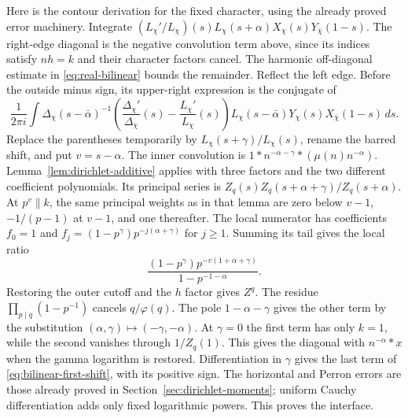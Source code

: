 Here is the contour derivation for the fixed character, using the
already proved error machinery. Integrate
$(L_\chi'/L_\chi)(s)L_\chi(s+\alpha)X_\chi(s)Y_{\bar\chi}(1-s)$.
The right-edge diagonal is the negative convolution term above, since
its indices satisfy $nh=k$ and their character factors cancel.
The harmonic off-diagonal estimate in \eqref{eq:real-bilinear} bounds
the remainder. Reflect the left edge. Before the outside minus sign,
its upper-right expression is the conjugate of
\[
 \frac1{2\pi i}\int
 \Delta_\chi(s-\bar\alpha)^{-1}
 \left(\frac{\Delta_\chi'}{\Delta_\chi}(s)
                         -\frac{L_\chi'}{L_\chi}(s)\right)
 L_\chi(s-\bar\alpha)Y_\chi(s)X_{\bar\chi}(1-s)\,ds.
\]
Replace the parentheses temporarily by $L_\chi(s+\gamma)/L_\chi(s)$,
rename the barred shift, and put $v=s-\alpha$. The inner convolution
is $1*n^{-\alpha-\gamma}*(\mu(n)n^{-\alpha})$.
Lemma~\ref{lem:dirichlet-additive} applies with three factors and the
two different coefficient polynomials. Its principal series is
$Z_q(s)Z_q(s+\alpha+\gamma)/Z_q(s+\alpha)$.
At $p^v\parallel k$, the same principal weights as in that lemma are
zero below $v-1$, $-1/(p-1)$ at $v-1$, and one thereafter.
The local numerator has coefficients $f_0=1$ and
$f_j=(1-p^\gamma)p^{-j(\alpha+\gamma)}$ for $j\ge1$.
Summing its tail gives the local ratio
\[
 \frac{(1-p^\gamma)p^{-v(1+\alpha+\gamma)}}{1-p^{-1-\alpha}}.
\]
Restoring the outer cutoff and the $h$ factor gives $Z^q$.
The residue $\prod_{p\mid q}(1-p^{-1})$ cancels $q/\varphi(q)$.
The pole $1-\alpha-\gamma$ gives the other term by the substitution
$(\alpha,\gamma)\mapsto(-\gamma,-\alpha)$.
At $\gamma=0$ the first term has only $k=1$, while the second
vanishes through $1/Z_q(1)$. This gives the diagonal with
$n^{-\alpha}*x$ when the gamma logarithm is restored.
Differentiation in $\gamma$ gives the last term of
\eqref{eq:bilinear-first-shift}, with its positive sign.
The horizontal and Perron errors are those already proved in
Section~\ref{sec:dirichlet-moments}; uniform Cauchy differentiation
adds only fixed logarithmic powers. This proves the interface.

